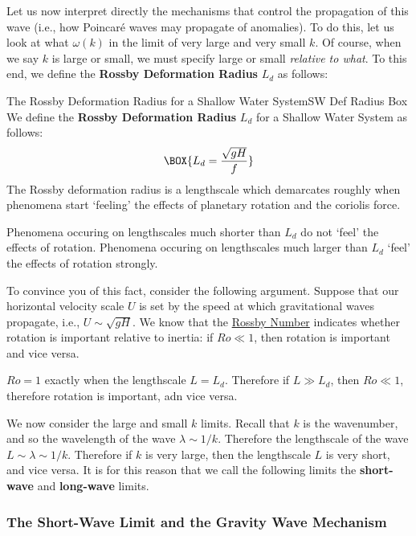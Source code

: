 Let us now interpret directly the mechanisms that control the propagation of this wave (i.e., how Poincaré waves may propagate of anomalies). To do this, let us look at what \(\omega(k)\) in the limit of very large and very small \(k\). Of course, when we say \(k\) is large or small, we must specify large or small \textit{relative to what}. To this end, we define the \textbf{Rossby Deformation Radius} \(L_d\) as follows:
\begin{fact}{The Rossby Deformation Radius for a Shallow Water System}{SW Def Radius Box}\label{SW Def Radius Box}
    We define the \textbf{Rossby Deformation Radius} \(L_d\) for a Shallow Water System as follows:
    \begin{gather}
        \BOX{L_d = \frac{\sqrt{gH}}{f}}
    \end{gather}
    The Rossby deformation radius is a lengthscale which demarcates roughly when phenomena start `feeling' the effects of planetary rotation and the coriolis force. 

    Phenomena occuring on lengthscales much shorter than \(L_d\) do not `feel' the effects of rotation. Phenomena occuring on lengthscales much larger than \(L_d\) `feel' the effects of rotation strongly.
\end{fact}

To convince you of this fact, consider the following argument. Suppose that our horizontal velocity scale \(U\) is set by the speed at which gravitational waves propagate, i.e., \(U\sim\sqrt{gH}\). We know that the \hyperref[Rossby Box]{Rossby Number} indicates whether rotation is important relative to inertia: if \(Ro\ll 1\), then rotation is important and vice versa.

\(Ro=1\) exactly when the lengthscale \(L=L_d\). Therefore if \(L\gg L_d\), then \(Ro\ll1\), therefore rotation is important, adn vice versa. 

We now consider the large and small \(k\) limits. Recall that \(k\) is the wavenumber, and so the wavelength of the wave \(\lambda\sim 1/k\). Therefore the lengthscale of the wave \(L\sim\lambda\sim 1/k\). Therefore if \(k\) is very large, then the lengthscale \(L\) is very short, and vice versa. It is for this reason that we call the following limits the \textbf{short-wave} and \textbf{long-wave} limits.

\subsubsection{The Short-Wave Limit and the Gravity Wave Mechanism}

